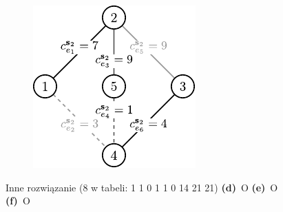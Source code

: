 \begin{figure}[!htbp]
\begin{subfigure}[b]{0.3\textwidth}
		\caption{}
		\label{fig:robincrexample:e}
	\end{subfigure}
	\hfill
	\begin{subfigure}[b]{0.3\textwidth}
		\includegraphics[width=\textwidth]{Chapter_II/ROB-INC-MST-example/c2}
		\caption{}
		\label{fig:robincrexample:f}
	\end{subfigure}
	\hfill\null
	\caption{
		Inne rozwiązanie (8 w tabeli: 1		1		0		1		1		0		14		21		21)
		\textbf{(d)}~O
		\textbf{(e)}~O
		\textbf{(f)}~O
	}
	\label{fig:robincrexample}
\end{figure}

